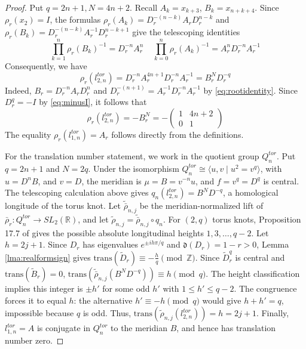 \documentclass{article}
\theoremstyle{plain}
\theoremstyle{definition}
\theoremstyle{plain}
\theoremstyle{plain}
\theoremstyle{plain}
\theoremstyle{remark}
\theoremstyle{remark}
\theoremstyle{plain}
\theoremstyle{plain}
\theoremstyle{plain}
\theoremstyle{plain}
\begin{document}
\begin{proof}
Put $q = 2n+1, N = 4n+2$. Recall $A_k = x_{k+3}$, $B_k = x_{n+k+4}$. Since $\rho_r(x_2) = I$, the formulas $\rho_r(A_k)=D_r^{-(n-k)}A_rD_r^{n-k}$ and $\rho_r(B_k) = D_r^{-(n-k)}A_r^{-1}D_r^{n-k+1}$ give the telescoping identities 
\begin{equation*}
	\prod_{k=1}^n\rho_r(B_k)^{-1} = D_r^{-n}A_r^n \ \ \ \ \ \prod_{k=0}^n\rho_r(A_k)^{-1} = A_r^nD_r^{-n}A_r^{-1}
\end{equation*}
Consequently, we have 
\begin{equation*}
	\rho_r(l_{2,n}^{tor}) = D_r^{-n}A_r^{4n+1}D_r^{-n}A_r^{-1} = B_r^ND_r^{-q}
\end{equation*}
Indeed, $B_r=D_r^{-n}A_rD_r^n$ and $D_r^{-(n+1)}=A_r^{-1}D_r^{-n}A_r^{-1}$ by \eqref{eq:rootidentity}. Since $D_r^q=-I$ by \eqref{eq:minusI}, it follows that 
\begin{equation*}
	\rho_r(l_{2,n}^{tor})=-B_r^N = -\begin{pmatrix}1&4n+2\\0&1\end{pmatrix}
\end{equation*}
The equality $\rho_r(l_{1,n}^{tor}) = A_r$ follows directly from the definitions.

\medskip

For the translation number statement, we work in the quotient group $Q_n^{tor}$. Put $q = 2n+1$ and $N = 2q$. Under the isomorphism $Q_n^{tor} \cong \langle u, v \mid u^2 = v^q \rangle$, with $u =D^nB$, and $v = D$, the meridian is $\mu = B = v^{-n}u$, and $f = v^q = D^q$ is central. The telescoping calculation above gives $q_n(l_{2,n}^{tor}) = B^ND^{-q}$, a homological longitude of the torus knot. Let $\widetilde{\bar\rho}_{n,j}$ be the meridian-normalized lift of $\bar\rho_r: Q_n^{tor} \to SL_2(\mathbb R)$, and let $\widetilde\rho_{n,j} = \widetilde{\bar\rho}_{n,j} \circ q_n$. For $(2, q)$ torus knots, Proposition 17.7 of \cite{dunfieldrasmussen} gives the possible absolute longitudinal heights $1, 3, \dots, q-2$. Let $h = 2j+1$. Since $D_r$ has eigenvalues $e^{\pm ih\pi/q}$ and $\mathfrak d(D_r) = 1 - r > 0$, Lemma \ref{lma:realformsign} gives $\mathrm{trans}(\widetilde D_r) \equiv -\frac{h}{q}\pmod{\mathbb Z}$. Since $\widetilde D_r^q$ is central and $\mathrm{trans}(\widetilde B_r) = 0$, $\mathrm{trans}(\widetilde{\bar\rho}_{n,j}(B^ND^{-q})) \equiv h \pmod q$. The height classification implies this integer is $\pm h'$ for some odd $h'$ with $1 \leq h' \leq q - 2$. The congruence forces it to equal $h$: the alternative $h' \equiv -h \pmod q$ would give $h + h' = q$, impossible because $q$ is odd. Thus, $\mathrm{trans}(\widetilde\rho_{n,j}(l_{2,n}^{tor})) = h = 2j+1$. Finally, $l_{1,n}^{tor} = A$ is conjugate in $Q_n^{tor}$ to the meridian $B$, and hence has translation number zero. 
\end{proof}
\end{document}
